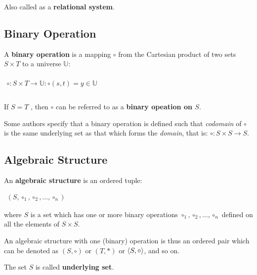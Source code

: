 Also called as a \textbf{relational system}.




\subsection{Binary Operation}
\label{sec:binary-operation}

A \textbf{binary operation} is a mapping $\circ$ from the Cartesian
product of two sets $S \times T$ to a universe $\mathbb{U}$:

\begin{math}
  \begin{array}{c}
    \\
    \circ: S \times T \to \mathbb{U} : \circ(s, t) = y \in \mathbb{U} \\
    \\
  \end{array}
\end{math}

If $S = T$ , then $\circ$ can be referred to as a \textbf{binary
  opeation on $S$}.

Some authors specify that a binary operation is defined such that
\textit{codomain} of $\circ$ is the same underlying set as that which
forms the \textit{domain}, that is: $\circ: S \times S \to S$.


\subsection{Algebraic Structure}
\label{sec:algebraic-structure}

An \textbf{algebraic structure} is an ordered tuple:

\begin{math}
  \begin{array}{c}
    (S, \circ_1, \circ_2, ..., \circ_n)
  \end{array}
\end{math}

where $S$ is a set which has one or more binary operations
$\circ_1, \circ_2, ..., \circ_n$ defined on all the elements of
$S \times S$.

An algebraic structure with one (binary) operation is thus an ordered
pair which can be denoted as $(S, \circ)$ or $(T, *)$ or
$\langle S, \circ \rangle$, and so on.

The set $S$ is called \textbf{underlying set}.


